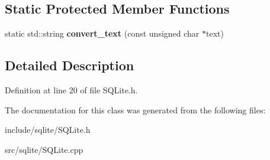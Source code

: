 \subsection*{Static Protected Member Functions}
\begin{DoxyCompactItemize}
\item 
\mbox{\label{class_s_q_lite_wrapper_a46a46fe7c7b6887967540721368acd7c}} 
static std\+::string {\bfseries convert\+\_\+text} (const unsigned char $\ast$text)
\end{DoxyCompactItemize}


\subsection{Detailed Description}


Definition at line 20 of file S\+Q\+Lite.\+h.



The documentation for this class was generated from the following files\+:\begin{DoxyCompactItemize}
\item 
include/sqlite/S\+Q\+Lite.\+h\item 
src/sqlite/S\+Q\+Lite.\+cpp\end{DoxyCompactItemize}
